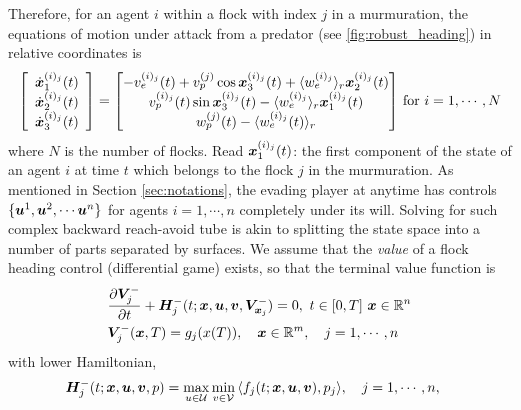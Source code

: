Therefore, for an agent $i$ within a flock with index $j$ in a murmuration, the equations of motion under attack from a predator (see \autoref{fig:robust_heading}) in relative coordinates is %
%
\begin{align}
\left[\begin{array}{c}
\dot{\state}_1^{(i)_j}(t) \\ \dot{\state}_2^{(i)_j} (t) \\ \dot{\state}_3^{(i)_j} (t)
\end{array}\right] = \begin{bmatrix}
-v_e^{(i)_j}(t) + v_p^{(j)} \cos \state_3^{(i)_j}(t) + \langle w_e^{(i)_j} \rangle_r \state_2^{(i)_j}(t)
%
\\
v_p^{(i)_j}(t)\sin \state_3^{(i)_j}(t) - \langle w_e^{(i)_j} \rangle_r \state_1^{(i)_j}(t)
\\ 
w_p^{(j)}(t) - \langle w_e^{(i)_j}(t) \rangle_r
\end{bmatrix} \, \text{for } i=1,\cdots, N
\end{align}
%
where $N$ is the number of flocks. Read ${\bm{x}}_1^{(i)_j}(t)$: the first component of the state of an agent $i$ at time $t$ which belongs to the flock $j$ in the murmuration. As mentioned in Section \ref{sec:notations}, the evading player at anytime has controls $\{\bm{u}^1, \bm{u}^2, \cdots \bm{u}^n\}$ for agents $i=1, \cdots, n$ completely  under its will. Solving for such complex backward reach-avoid tube is akin to splitting the state space into a number of parts separated by surfaces. 
We assume that the \textit{value} of a flock heading control (differential game) exists, so that the terminal value function is
%
\begin{subequations}
\begin{align}
&\frac{\partial \bm{V}^-_j}{\partial t} + \bm{H}^-_j (t; \bm{x}, \bm{u}, \bm{v}, \bm{V}^-_{\bm{x}_j}) = 0, \,\, t\in \left[0, T\right]\, \bm{x} \in \mathbb{R}^n  \\
&\bm{V}^-_j(\bm{x}, T) = g_j(x(T)), \quad \bm{x} \in \mathbb{R}^m , \quad j = 1, \cdots, n
\label{eq:lower_visc_boundary_surfaces}
\end{align}
\label{eq:lower_visc_surfaces}
\end{subequations}
%
with lower Hamiltonian, 
%
\begin{align}
&\bm{H}^-_j (t; \bm{x}, \bm{u}, \bm{v}, p) = \max_{u \in \mathcal{U}} \min_{v \in \mathcal{V}} \, \langle f_j(t; \bm{x}, \bm{u}, \bm{v}), p_j  \rangle, \quad j = 1, \cdots, n,
\label{eq:lower_visc_ham_surfaces}
\end{align}
